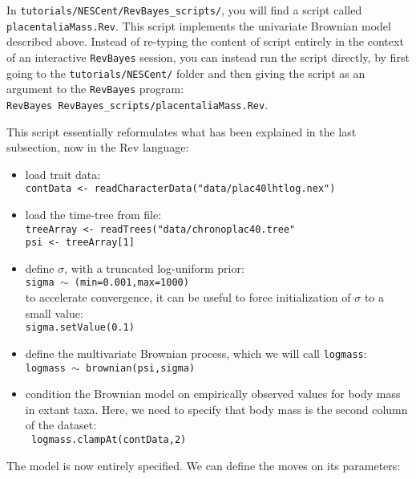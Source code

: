 \documentclass[usletter]{article}
\newcommand{\cmd}[1]{\texttt{#1}}
\begin{document}
In \cmd{tutorials/NESCent/RevBayes\_scripts/}, you will find a script called \cmd{placentaliaMass.Rev}.
This script implements the univariate Brownian model described above. Instead of re-typing the content of script entirely in the context of an interactive \cmd{RevBayes} session, you can instead run the script directly, by first going to the \cmd{tutorials/NESCent/} folder and then giving the script as an argument to the \cmd{RevBayes} program:
\\
\cmd{RevBayes RevBayes\_scripts/placentaliaMass.Rev}.

This script essentially reformulates what has been explained in the last subsection, now in the Rev language:
\begin{itemize}
\item
load trait data:
\\
\cmd{contData <- readCharacterData("data/plac40lhtlog.nex")}
\item
load the time-tree from file:
\\
\cmd{treeArray <- readTrees("data/chronoplac40.tree"
\\
psi <- treeArray[1]
}
\item
define $\sigma$, with a truncated log-uniform prior:
\\
\cmd{sigma $\sim$ (min=0.001,max=1000)}
\\
to accelerate convergence, it can be useful to force initialization of $\sigma$ to a small value:
\\
\cmd{sigma.setValue(0.1)}
\item
define the multivariate Brownian process, which we will call \cmd{logmass}:
\\
\cmd{logmass $\sim$ brownian(psi,sigma)}
\item
condition the Brownian model on empirically observed values for body mass in extant taxa.
Here, we need to specify that body mass is the second column of the dataset:
\\
\cmd{
logmass.clampAt(contData,2)
}
\end{itemize}
The model is now entirely specified. We can define the moves on its parameters:
\end{document}
